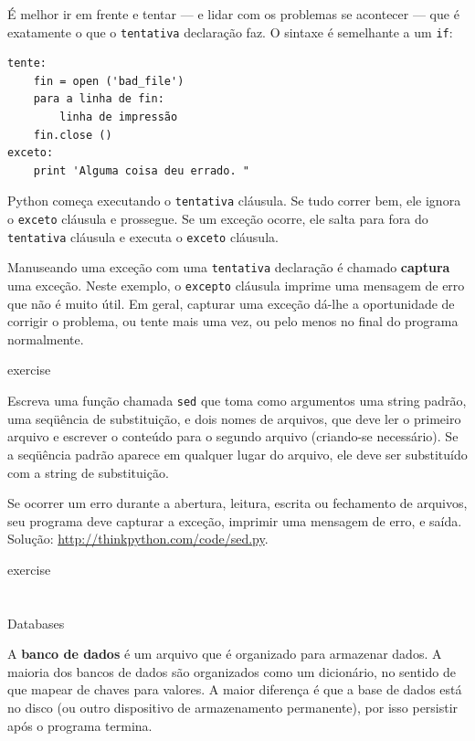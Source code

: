 \documentclass[10pt]{book}
\begin{document}
\begin{exercise}
\begin{v erbatim}
É melhor ir em frente e tentar --- e lidar com os problemas se
acontecer --- que é exatamente o que o {\tt tentativa} declaração faz. O
sintaxe é semelhante a um {\tt if}:

\begin{verbatim}
tente:    
    fin = open ('bad_file')
    para a linha de fin:
        linha de impressão
    fin.close ()
exceto:
    print 'Alguma coisa deu errado. "
\end{verbatim}
%
Python começa executando o {\tt tentativa} cláusula. Se tudo correr
bem, ele ignora o {\tt exceto} cláusula e prossegue. Se um
exceção ocorre, ele salta para fora do {\tt tentativa} cláusula e
executa o {\tt exceto} cláusula.

Manuseando uma exceção com uma {\tt tentativa} declaração é chamado {\bf
captura} uma exceção. Neste exemplo, o {\tt excepto} cláusula
imprime uma mensagem de erro que não é muito útil. Em geral,
capturar uma exceção dá-lhe a oportunidade de corrigir o problema, ou tente
mais uma vez, ou pelo menos no final do programa normalmente.

\begin{} exercise

Escreva uma função chamada {\tt sed} que toma como argumentos uma string padrão,
uma seqüência de substituição, e dois nomes de arquivos, que deve ler o primeiro arquivo
e escrever o conteúdo para o segundo arquivo (criando-se
necessário). Se a seqüência padrão aparece em qualquer lugar do arquivo, ele
deve ser substituído com a string de substituição.

Se ocorrer um erro durante a abertura, leitura, escrita ou fechamento de arquivos,
seu programa deve capturar a exceção, imprimir uma mensagem de erro, e
saída. Solução: \url{http://thinkpython.com/code/sed.py}.

\end{} exercise


\section{} Databases

A {\bf banco de dados} é um arquivo que é organizado para armazenar dados.
A maioria dos bancos de dados são organizados como um dicionário, no sentido de
que mapear de chaves para valores. A maior diferença
é que a base de dados está no disco (ou outro dispositivo de armazenamento permanente),
por isso persistir após o programa termina.


\end{v erbatim}
\end{exercise}
\end{document}
